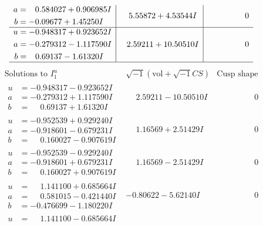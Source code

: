 \documentclass[1p]{elsarticle_modified}
\theoremstyle{definition}
\newcommand{\I}{\sqrt{-1}}
\begin{document}
$$\begin{array}{c|c|c}
\begin{aligned}
a &= \phantom{-}0.584027 + 0.906985 I \\
b &= -0.09677 + 1.45250 I\end{aligned}
 & \phantom{-}5.55872 + 4.53544 I & \phantom{-0.000000 } 0 \\ \hline\begin{aligned}
u &= -0.948317 + 0.923652 I \\
a &= -0.279312 - 1.117590 I \\
b &= \phantom{-}0.69137 - 1.61320 I\end{aligned}
 & \phantom{-}2.59211 + 10.50510 I & \phantom{-0.000000 } 0\\
 \hline 
 \end{array}$$\newpage$$\begin{array}{c|c|c}  
\text{Solutions to }I^u_{1}& \I (\text{vol} + \sqrt{-1}CS) & \text{Cusp shape}\\
 \hline 
\begin{aligned}
u &= -0.948317 - 0.923652 I \\
a &= -0.279312 + 1.117590 I \\
b &= \phantom{-}0.69137 + 1.61320 I\end{aligned}
 & \phantom{-}2.59211 - 10.50510 I & \phantom{-0.000000 } 0 \\ \hline\begin{aligned}
u &= -0.952539 + 0.929240 I \\
a &= -0.918601 - 0.679231 I \\
b &= \phantom{-}0.160027 - 0.907619 I\end{aligned}
 & \phantom{-}1.16569 + 2.51429 I & \phantom{-0.000000 } 0 \\ \hline\begin{aligned}
u &= -0.952539 - 0.929240 I \\
a &= -0.918601 + 0.679231 I \\
b &= \phantom{-}0.160027 + 0.907619 I\end{aligned}
 & \phantom{-}1.16569 - 2.51429 I & \phantom{-0.000000 } 0 \\ \hline\begin{aligned}
u &= \phantom{-}1.141100 + 0.685664 I \\
a &= \phantom{-}0.581015 - 0.421440 I \\
b &= -0.476699 - 1.180220 I\end{aligned}
 & -0.80622 - 5.62140 I & \phantom{-0.000000 } 0 \\ \hline\begin{aligned}
u &= \phantom{-}1.141100 - 0.685664 I \\

\end{aligned}
\end{array}$$
\end{document}
